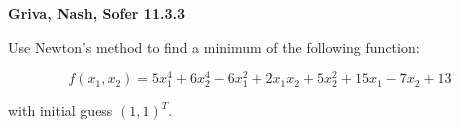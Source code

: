 \textbf{Griva, Nash, Sofer 11.3.3}

Use Newton's method to find a minimum of the following function:

$$
f(x_1, x_2) = 5 x_1^4 + 6 x_2^4 - 6 x_1^2 + 2 x_1 x_2 + 5 x_2^2 + 15 x_1 - 7 x_2 + 13
$$

with initial guess $(1, 1)^T$.

\begin{solution}
    \ \\
    \vfill
\end{solution}
